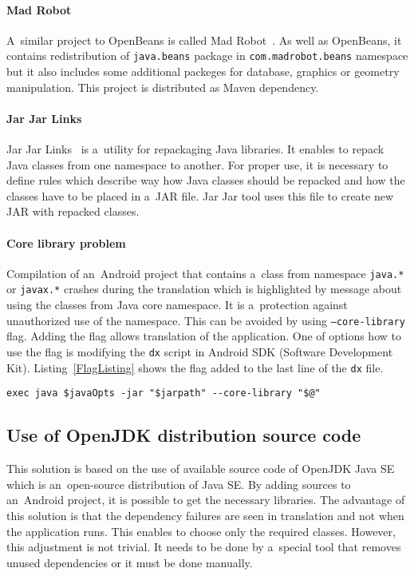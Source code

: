 \paragraph{Mad Robot}
A~similar project to OpenBeans is called Mad Robot~\cite{MadRobot}. As well as OpenBeans, it contains redistribution of
\texttt{java.beans} package in \texttt{com.madrobot.beans} namespace but it also includes some additional packeges for
database, graphics or geometry manipulation. This project is distributed as Maven dependency.

\paragraph{Jar Jar Links}
Jar Jar Links~\cite{JarJar} is a~utility for repackaging Java libraries. It enables to repack Java classes from one
namespace to another. For proper use, it is necessary to define rules which describe way how Java classes should be
repacked and how the classes have to be placed in a~JAR file. Jar Jar tool uses this file to create new JAR with
repacked classes.

\paragraph{Core library problem}
Compilation of an~Android project that contains a~class from namespace \texttt{java.*} or \texttt{javax.*} crashes
during the translation which is highlighted by message about using the classes from Java core namespace. It is
a~protection against unauthorized use of the namespace. This can be avoided by using \texttt{--core-library} flag.
Adding the flag allows translation of the application. One of options how to use the flag is modifying the \texttt{dx}
script in Android SDK (Software Development Kit). Listing~\ref{FlagListing} shows the flag added to the last line of the
\texttt{dx} file.
\\
\begin{lstlisting}[captionpos={b},caption={Core library flag in the last line of \texttt{dx} script.},frame={lines},
label={FlagListing},basicstyle=\footnotesize]
exec java $javaOpts -jar "$jarpath" --core-library "$@"
\end{lstlisting}

\subsection{Use of OpenJDK distribution source code}\label{OpenJdkDistrSection}
This solution is based on the use of available source code of OpenJDK Java SE~\cite{OpenJDK} which is an~open-source
distribution of Java SE. By adding sources to an~Android project, it is possible to get the necessary libraries. The
advantage of this solution is that the dependency failures are seen in translation and not when the application runs.
This enables to choose only the required classes. However, this adjustment is not trivial. It needs to be done by
a~special tool that removes unused dependencies or it must be done manually.


